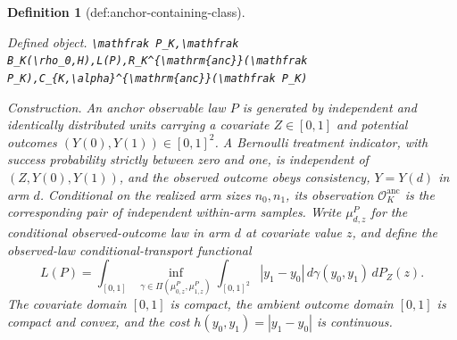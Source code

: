 \documentclass{article}
\newtheorem{definition}{Definition}
\begin{document}
\begin{definition}[def:anchor-containing-class]\label{def:anchor-containing-class}
\par\smallskip\noindent\emph{Defined object.} \texttt{\textbackslash{}\allowbreak{}mathfrak P\_\allowbreak{}K,\allowbreak{}\textbackslash{}\allowbreak{}mathfrak B\_\allowbreak{}K(\textbackslash{}\allowbreak{}rho\_\allowbreak{}0,\allowbreak{}H),\allowbreak{}L(P),\allowbreak{}R\_\allowbreak{}K\textasciicircum{}\{\textbackslash{}\allowbreak{}mathrm\{anc\}\allowbreak{}\}\allowbreak{}(\textbackslash{}\allowbreak{}mathfrak P\_\allowbreak{}K),\allowbreak{}C\_\allowbreak{}\{K,\allowbreak{}\textbackslash{}\allowbreak{}alpha\}\allowbreak{}\textasciicircum{}\{\textbackslash{}\allowbreak{}mathrm\{anc\}\allowbreak{}\}\allowbreak{}(\textbackslash{}\allowbreak{}mathfrak P\_\allowbreak{}K)}
\par\smallskip\noindent\emph{Construction.} An anchor observable law \(P\) is generated by independent and
identically distributed units carrying a covariate \(Z\in[0,1]\) and
potential outcomes \((Y(0),Y(1))\in[0,1]^2\).  A Bernoulli treatment
indicator, with success probability strictly between zero and one, is
independent of \((Z,Y(0),Y(1))\), and the observed outcome obeys
consistency, \(Y=Y(d)\) in arm \(d\).  Conditional on the realized arm
sizes \(n_0,n_1\), its observation \(\mathcal O_K^{\mathrm{anc}}\) is
the corresponding pair of independent within-arm samples.  Write
\(\mu_{d,z}^P\) for the conditional observed-outcome law in arm \(d\)
at covariate value \(z\), and define the observed-law
conditional-transport functional
\[
 L(P)=\int_{[0,1]}
 \inf_{\gamma\in\Pi(\mu_{0,z}^P,\mu_{1,z}^P)}
 \int_{[0,1]^2}|y_1-y_0|\,d\gamma(y_0,y_1)\,dP_Z(z).
 \tag{41}
\]
The covariate domain \([0,1]\) is compact, the ambient outcome domain
\([0,1]\) is compact and convex, and the cost
\(h(y_0,y_1)=|y_1-y_0|\) is continuous.


\end{definition}
\end{document}
